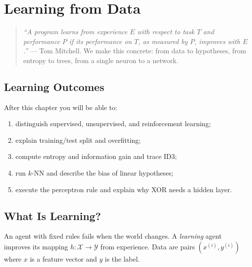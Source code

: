 \chapter{Learning from Data}
\label{ch:learning}

\begin{quote}
\emph{``A program learns from experience $E$ with respect to task $T$ and performance $P$ if its performance on $T$, as measured by $P$, improves with $E$.''} --- Tom Mitchell. We make this concrete: from data to hypotheses, from entropy to trees, from a single neuron to a network.
\end{quote}

\noindent{}
\vspace{0.4em}

\section*{Learning Outcomes}
After this chapter you will be able to:
\begin{enumerate}[label=(L\arabic*)]
    \item distinguish supervised, unsupervised, and reinforcement learning;
    \item explain training/test split and overfitting;
    \item compute entropy and information gain and trace ID3;
    \item run $k$-NN and describe the bias of linear hypotheses;
    \item execute the perceptron rule and explain why XOR needs a hidden layer.
\end{enumerate}

\section{What Is Learning?}
\label{sec:what-is-learning}
An agent with fixed rules fails when the world changes. A \emph{learning} agent improves its mapping $h:\mathcal{X}\to\mathcal{Y}$ from experience. Data are pairs $(x^{(i)},y^{(i)})$ where $x$ is a feature vector and $y$ is the label.

